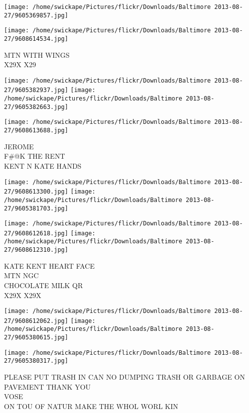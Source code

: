 \documentclass[10pt,letterpaper]{article}
\begin{document}
\texttt{[image: /home/swickape/Pictures/flickr/Downloads/Baltimore 2013-08-27/9605369857.jpg]}

\vspace{0.25in}
\texttt{[image: /home/swickape/Pictures/flickr/Downloads/Baltimore 2013-08-27/9608614534.jpg]}

MTN WITH WINGS\\
X29X X29\\
\pagebreak

\texttt{[image: /home/swickape/Pictures/flickr/Downloads/Baltimore 2013-08-27/9605382937.jpg]}
\texttt{[image: /home/swickape/Pictures/flickr/Downloads/Baltimore 2013-08-27/9605382663.jpg]}

\vspace{0.25in}
\texttt{[image: /home/swickape/Pictures/flickr/Downloads/Baltimore 2013-08-27/9608613688.jpg]}

JEROME\\
F\#@K THE RENT\\
KENT N KATE HANDS\\
\pagebreak

\texttt{[image: /home/swickape/Pictures/flickr/Downloads/Baltimore 2013-08-27/9608613300.jpg]}
\texttt{[image: /home/swickape/Pictures/flickr/Downloads/Baltimore 2013-08-27/9605381703.jpg]}

\texttt{[image: /home/swickape/Pictures/flickr/Downloads/Baltimore 2013-08-27/9608612618.jpg]}
\texttt{[image: /home/swickape/Pictures/flickr/Downloads/Baltimore 2013-08-27/9608612310.jpg]}

KATE KENT HEART FACE\\
MTN NGC\\
CHOCOLATE MILK QR\\
X29X X29X\\
\pagebreak

\texttt{[image: /home/swickape/Pictures/flickr/Downloads/Baltimore 2013-08-27/9608612062.jpg]}
\texttt{[image: /home/swickape/Pictures/flickr/Downloads/Baltimore 2013-08-27/9605380615.jpg]}

\texttt{[image: /home/swickape/Pictures/flickr/Downloads/Baltimore 2013-08-27/9605380317.jpg]}

PLEASE PUT TRASH IN CAN NO DUMPING TRASH OR GARBAGE ON PAVEMENT THANK YOU\\
VOSE\\
ON TOU OF NATUR MAKE THE WHOL WORL KIN\\
\pagebreak
\end{document}
